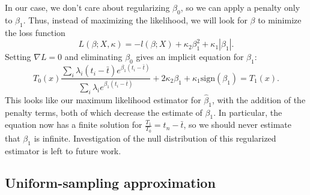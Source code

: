 \documentclass[12pt, letterpaper]{article}
\begin{document}
In our case, we don't care about regularizing $\beta_0$, so we can apply a penalty only to $\beta_1$.
Thus, instead of maximizing the likelihood, we will look for $\beta$ to minimize the loss function
\begin{equation}
    L(\beta; X, \kappa) = - l(\beta; X) + \kappa_2 \beta_1^2 + \kappa_1 |\beta_1|.
\end{equation}
Setting $\nabla L = 0$ and eliminating $\beta_0$ gives an implicit equation for $\beta_1$:
\begin{equation}
    T_0(x) \frac{\sum_i \lambda_i (t_i - \bar{t}) e^{\beta_1 (t_i - \bar{t})}}{\sum_i \lambda_i e^{\beta_1 (t_i - \bar{t})}} + 2 \kappa_2 \beta_1 + \kappa_1 \text{sign}(\beta_1) = T_1(x).
\end{equation}
This looks like our maximum likelihood estimator for $\hat{\beta}_1$, with the addition of the penalty terms,
both of which decrease the estimate of $\beta_1$.
In particular, the equation now has a finite solution for $\frac{T_1}{T_0} = t_n - \bar{t}$, so we should never estimate that $\beta_1$ is infinite.
Investigation of the null distribution of this regularized estimator is left to future work.

\subsection{Uniform-sampling approximation}
\end{document}
